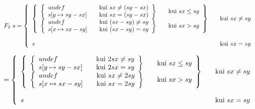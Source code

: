 \(
F_2 \ s = 
\left\{
  \begin{array}{l l}
  \left\{
    \begin{array}{l l}
    \left\{
      \begin{array}{l l}
        undef & \quad \text{kui}\ sx \neq (sy - sx) \\
        s[y \mapsto sy - sx] & \quad \text{kui}\ sx = (sy - sx)
      \end{array}
    \right\} & \quad \text{kui}\ sx \leq sy
    \\
    \left\{
      \begin{array}{l l}
        undef & \quad \text{kui}\ (sx - sy) \neq sy \\
        s[x \mapsto sx - sy] & \quad \text{kui}\ (sx - sy) = sy\\
      \end{array}
    \right\} & \quad \text{kui}\ sx > sy
    \end{array}
  \right\}
  &  \quad \text{kui}\ sx \neq sy \\
  \\
  s   & \quad \text{kui}\ sx = sy\\
  \end{array}
\right.
\)

\(
= 
\left\{
  \begin{array}{l l}
  \left\{
    \begin{array}{l l}
    \left\{
      \begin{array}{l l}
        undef & \quad \text{kui}\ 2sx \neq sy \\
        s[y \mapsto sy - sx] & \quad \text{kui}\ 2sx = sy
      \end{array}
    \right\} & \quad \text{kui}\ sx \leq sy
    \\
    \left\{
      \begin{array}{l l}
        undef & \quad \text{kui}\ sx \neq 2sy \\
        s[x \mapsto sx - sy] & \quad \text{kui}\ sx = 2sy\\
      \end{array}
    \right\} & \quad \text{kui}\ sx > sy
    \end{array}
  \right\}
  &  \quad \text{kui}\ sx \neq sy \\
  \\
  s   & \quad \text{kui}\ sx = sy\\
  \end{array}
\right.
\)

